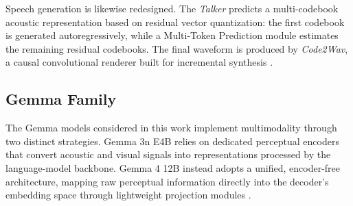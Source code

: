 Speech generation is likewise redesigned. The \textit{Talker} predicts a multi-codebook acoustic representation based on residual vector quantization: the first codebook is generated autoregressively, while a Multi-Token Prediction module estimates the remaining residual codebooks. The final waveform is produced by \textit{Code2Wav}, a causal convolutional renderer built for incremental synthesis \cite{qwen3omni}.
\subsection*{Gemma Family}
The Gemma models considered in this work implement multimodality through two distinct strategies. Gemma 3n E4B relies on dedicated perceptual encoders that convert acoustic and visual signals into representations processed by the language-model backbone. Gemma 4 12B instead adopts a unified, encoder-free architecture, mapping raw perceptual information directly into the decoder's embedding space through lightweight projection modules \cite{gemma3n2025,gemma4technicalreport}.
